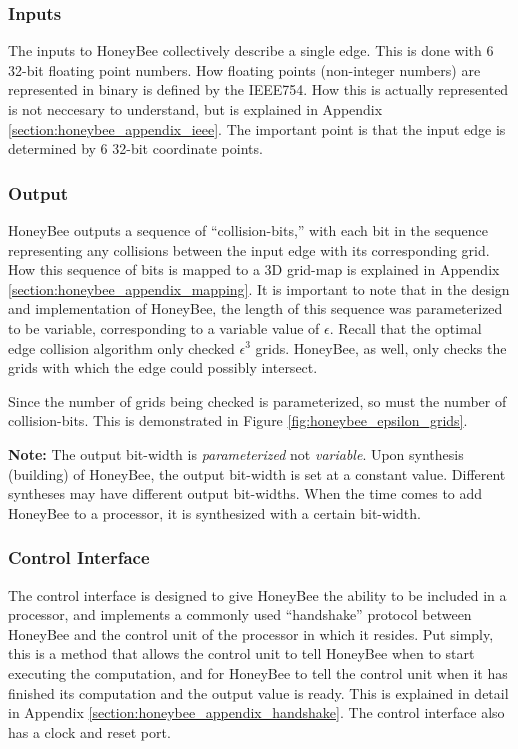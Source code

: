     \subsubsection{Inputs}
        The inputs to HoneyBee collectively describe a single edge. This is done with 6 32-bit floating point numbers. How floating points (non-integer numbers) are represented in binary is defined by the \gls{IEEE754}. How this is actually represented is not neccesary to understand, but is explained in Appendix \ref{section:honeybee_appendix_ieee}. The important point is that the input edge is determined by 6 32-bit coordinate points.

    \subsubsection{Output}
        HoneyBee outputs a sequence of ``collision-bits,'' with each bit in the sequence representing any collisions between the input edge with its corresponding grid. How this sequence of bits is mapped to a \gls{3D} grid-map is explained in Appendix \ref{section:honeybee_appendix_mapping}. It is important to note that in the design and implementation of HoneyBee, the length of this sequence was parameterized to be variable, corresponding to a variable value of $\epsilon$. Recall that the optimal edge collision algorithm only checked $\epsilon^3$ grids. HoneyBee, as well, only checks the grids with which the edge could possibly intersect.

        Since the number of grids being checked is parameterized, so must the number of collision-bits. This is demonstrated in Figure \ref{fig:honeybee_epsilon_grids}.
        

        \textbf{Note:} The output \gls{bit-width} is \textit{parameterized} not \textit{variable}. Upon synthesis (building) of HoneyBee, the output \gls{bit-width} is set at a constant value. Different syntheses may have different output \glspl{bit-width}. When the time comes to add HoneyBee to a processor, it is synthesized with a certain \gls{bit-width}.

    \subsubsection{Control Interface}
        The control interface is designed to give HoneyBee the ability to be included in a processor, and implements a commonly used ``handshake'' protocol between HoneyBee and the control unit of the processor in which it resides. Put simply, this is a method that allows the control unit to tell HoneyBee when to start executing the computation, and for HoneyBee to tell the control unit when it has finished its computation and the output value is ready. This is explained in detail in Appendix \ref{section:honeybee_appendix_handshake}. The control interface also has a clock and reset port.


